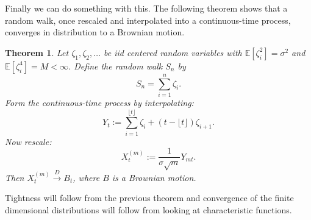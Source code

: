 \documentclass[11pt,letterpaper]{article}
\newcommand{\E}{\mathbb{E}}
\newcommand{\dist}{\xrightarrow{D}}
\theoremstyle{plain}
\newtheorem{theorem}{Theorem}[section] %
\theoremstyle{definition}
\begin{document}
\noindent Finally we can do something with this. The following theorem shows that a random walk, once rescaled and interpolated into a continuous-time process, converges in distribution to a Brownian motion.
\begin{theorem}
	Let $\zeta_1, \zeta_2, \ldots$ be iid centered random variables with $\E[\zeta_i^2] = \sigma^2$ and $\E[\zeta_i^4] = M<\infty$. Define the random walk $S_n$ by
	\[
	S_n = \sum_{i=1}^n \zeta_i.
	\]
	Form the continuous-time process by interpolating:
	\[
	Y_t:= \sum_{i=1}^{\lfloor t\rfloor}\zeta_i + (t-\lfloor t\rfloor)\zeta_{i+1}.
	\]
	Now rescale:
	\[
	X^{(m)}_t := \frac{1}{\sigma\sqrt{m}}Y_{mt}.
	\]
	Then $X^{(m)}_t\dist B_t$, where $B$ is a Brownian motion.
\end{theorem}

\noindent Tightness will follow from the previous theorem and convergence of the finite dimensional distributions will follow from looking at characteristic functions.
\end{document}
